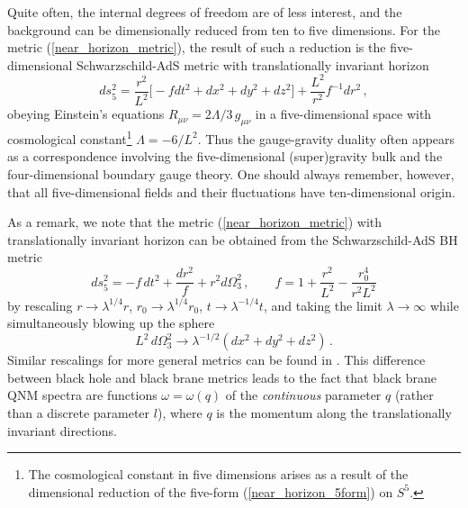 \documentclass[]{iopart}
\begin{document}
Quite often, the internal degrees of freedom are of less interest, and the
background can be dimensionally reduced from ten to five dimensions.  For the
metric (\ref{near_horizon_metric}), the result of such a reduction is the
five-dimensional Schwarzschild-AdS metric with translationally invariant
horizon
%
\begin{equation}\label{near_horizon_metric_sads}
  ds^2_{5} = \frac{r^2}{L^2} \Biggl[ -f dt^2 + dx^2 + dy^2 +dz^2 \Biggr]+
   \frac{L^2}{r^2} f^{-1}dr^2\,,
\end{equation}
%
obeying Einstein's equations $R_{\mu\nu} = 2 \Lambda/3\, g_{\mu\nu}$ in a
five-dimensional space with cosmological constant\footnote{The cosmological
  constant in five dimensions arises as a result of the dimensional reduction
  of the five-form (\ref{near_horizon_5form}) on $S^5$.}  $\Lambda = -6/L^2$.
Thus the gauge-gravity duality often appears as a correspondence involving
the five-dimensional (super)gravity bulk and the four-dimensional boundary
gauge theory.  One should always remember, however, that all five-dimensional
fields and their fluctuations have ten-dimensional origin.

As a remark, we note that the metric (\ref{near_horizon_metric}) with
translationally invariant horizon can be obtained from the Schwarzschild-AdS
BH metric
%
\begin{equation}
 ds^2_{5} =  - f\, dt^2 + \frac{dr^2}{f} + r^2 d\Omega_3^2\,, \qquad f = 1 +\frac{r^2}{L^2}
- \frac{r_0^4}{r^2 L^2}
\end{equation}
%
by rescaling $r\rightarrow \lambda^{1/4} r$, $r_0\rightarrow \lambda^{1/4}
r_0$, $t\rightarrow \lambda^{-1/4} t$, and taking the limit $\lambda
\rightarrow \infty$ while simultaneously blowing up the sphere
%
\begin{equation}
L^2\,  d\Omega_3^2 \rightarrow \lambda^{-1/2} \left( dx^2 + dy^2 +dz^2 \right)\,.
\end{equation}
%
Similar rescalings for more general metrics can be found in
\cite{Chamblin:1999tk, Son:2006em}.  This difference between black hole and
black brane metrics leads to the fact that black brane QNM spectra are
functions $\omega = \omega(q)$ of the {\it continuous} parameter $q$ (rather
than a discrete parameter $l$), where $q$ is the momentum along the
translationally invariant directions.
\end{document}
